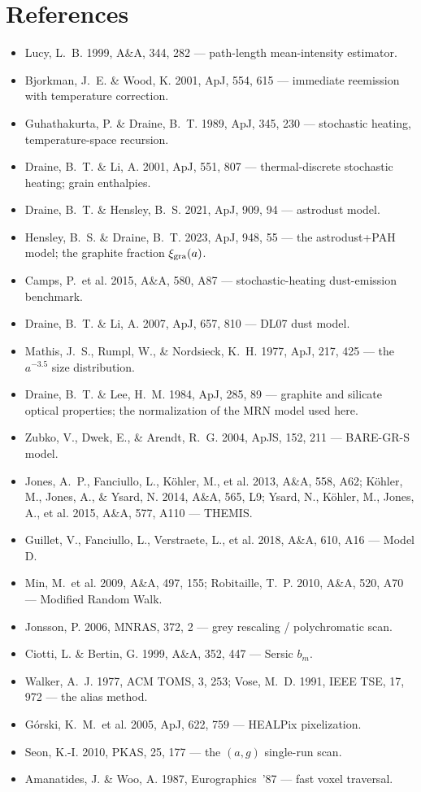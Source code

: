 \documentclass[english,a4paper]{kiseon_memo}
\begin{document}
\section*{References}
\begin{itemize}\small
\item Lucy, L.~B. 1999, A\&A, 344, 282 --- path-length mean-intensity estimator.
\item Bjorkman, J.~E. \& Wood, K. 2001, ApJ, 554, 615 --- immediate reemission
      with temperature correction.
\item Guhathakurta, P. \& Draine, B.~T. 1989, ApJ, 345, 230 --- stochastic
      heating, temperature-space recursion.
\item Draine, B.~T. \& Li, A. 2001, ApJ, 551, 807 --- thermal-discrete stochastic
      heating; grain enthalpies.
\item Draine, B.~T. \& Hensley, B.~S. 2021, ApJ, 909, 94 --- astrodust model.
\item Hensley, B.~S. \& Draine, B.~T. 2023, ApJ, 948, 55 --- the astrodust+PAH
      model; the graphite fraction $\xi_{\rm gra}(a)$.
\item Camps, P.\ et al. 2015, A\&A, 580, A87 --- stochastic-heating dust-emission
      benchmark.
\item Draine, B.~T. \& Li, A. 2007, ApJ, 657, 810 --- DL07 dust model.
\item Mathis, J.~S., Rumpl, W., \& Nordsieck, K.~H. 1977, ApJ, 217, 425 --- the
      $a^{-3.5}$ size distribution.
\item Draine, B.~T. \& Lee, H.~M. 1984, ApJ, 285, 89 --- graphite and silicate
      optical properties; the normalization of the MRN model used here.
\item Zubko, V., Dwek, E., \& Arendt, R.~G. 2004, ApJS, 152, 211 --- BARE-GR-S
      model.
\item Jones, A.~P., Fanciullo, L., K\"ohler, M., et al. 2013, A\&A, 558, A62;
      K\"ohler, M., Jones, A., \& Ysard, N. 2014, A\&A, 565, L9; Ysard, N.,
      K\"ohler, M., Jones, A., et al. 2015, A\&A, 577, A110 --- THEMIS.
\item Guillet, V., Fanciullo, L., Verstraete, L., et al. 2018, A\&A, 610, A16
      --- Model D.
\item Min, M.\ et al. 2009, A\&A, 497, 155; Robitaille, T.~P. 2010, A\&A, 520,
      A70 --- Modified Random Walk.
\item Jonsson, P. 2006, MNRAS, 372, 2 --- grey rescaling / polychromatic scan.
\item Ciotti, L. \& Bertin, G. 1999, A\&A, 352, 447 --- Sersic $b_m$.
\item Walker, A.~J. 1977, ACM TOMS, 3, 253; Vose, M.~D. 1991, IEEE TSE, 17, 972
      --- the alias method.
\item G\'orski, K.~M.\ et al. 2005, ApJ, 622, 759 --- HEALPix pixelization.
\item Seon, K.-I. 2010, PKAS, 25, 177 --- the $(a,g)$ single-run scan.
\item Amanatides, J. \& Woo, A. 1987, Eurographics~'87 --- fast voxel traversal.
\end{itemize}
\end{document}
